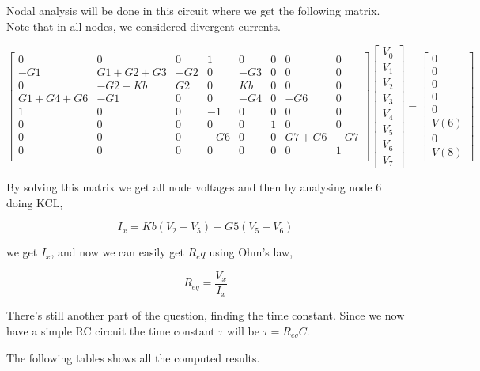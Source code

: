 \par Nodal analysis will be done in this circuit where we get the following matrix. Note that in all nodes, we considered divergent currents.

$$
\begin{bmatrix}
0 & 0 & 0 & 1 & 0 & 0 & 0 & 0 \\
-G1 & G1+G2+G3 & -G2 & 0 & -G3 & 0 & 0 & 0 \\
0 & -G2-Kb & G2 & 0 & Kb & 0 & 0 & 0 \\
G1+G4+G6 & -G1 & 0 & 0 & -G4 & 0 & -G6 & 0 \\
1 & 0 & 0 & -1 & 0 & 0 & 0 & 0 \\
0 & 0 & 0 & 0 & 0 & 1 & 0 & 0 \\
0 & 0 & 0 & -G6 & 0 & 0 & G7+G6 & -G7 \\
0 & 0 & 0 & 0 & 0 & 0 & 0 & 1 \\
\end{bmatrix}
\begin{bmatrix}
V_0 \\
V_1 \\
V_2 \\
V_3 \\
V_4 \\
V_5 \\
V_6 \\
V_7  
\end{bmatrix}
=
\begin{bmatrix}
0 \\
0 \\
0 \\
0 \\
0 \\
V(6) \\
0 \\
V(8)  
\end{bmatrix}
$$

\par By solving this matrix we get all node voltages and then by analysing node 6 doing KCL,

\begin{equation}
  I_{x} = Kb(V_2-V_5) - G5(V_5-V_6)
  \label{eq:2)aux1}
\end{equation}

we get $I_x$, and now we can easily get $R_eq$ using Ohm's law,

\begin{equation}
  R_{eq} = \frac{V_x}{I_x}
  \label{eq:2)aux2}
\end{equation}

\par There's still another part of the question, finding the time constant. Since we now have a simple RC circuit the time constant $\tau$ will be $\tau = R_{eq}C$.
\par The following tables shows all the computed results.

